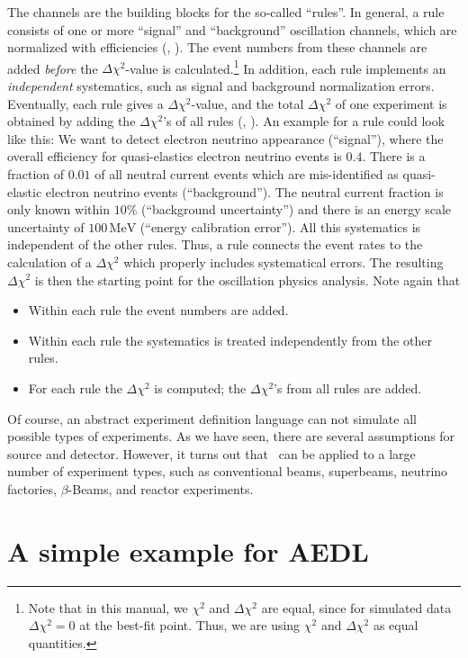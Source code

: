 The channels are the building blocks for the so-called ``rules''. In general, a rule consists of one or more ``signal'' and ``background'' oscillation channels, which are normalized with efficiencies
(\cf, ). The event numbers from these channels are added {\em before} the $\Delta \chi^2$-value is calculated.\footnote{Note that
in this manual, we $\chi^2$ and $\Delta \chi^2$ are equal, since
for simulated data $\Delta \chi^2 = 0$ at the best-fit point. Thus, we
are using $\chi^2$ and $\Delta \chi^2$ as equal quantities.} In addition, each rule implements an {\em independent} systematics, such as signal and background normalization errors. Eventually, each rule gives a $\Delta \chi^2$-value, and the total $\Delta \chi^2$ of one experiment is obtained by adding the $\Delta \chi^2$'s of all rules (\cf, ). 
 An example for a rule could look like this: We want to detect electron
  neutrino appearance (``signal''), where the overall efficiency for 
  quasi-elastics electron neutrino events is $0.4$. There is a fraction of 
  $0.01$ of all neutral current events which are mis-identified as 
  quasi-elastic electron neutrino events (``background''). The neutral 
  current fraction is only known within $10\%$ (``background uncertainty'') 
  and there is
an energy scale uncertainty of $100\,\mathrm{MeV}$ (``energy calibration error'').
All this systematics is independent of the other rules.  Thus, a rule connects the event rates to the calculation of a $\Delta \chi^2$ which properly includes systematical errors. The resulting $\Delta \chi^2$ is then the starting point for the oscillation physics analysis. Note again that
\begin{itemize}
\item
 Within each rule the event numbers are added.
\item
 Within each rule the systematics is treated independently from the other rules.
\item
 For each rule the $\Delta \chi^2$ is computed; the $\Delta \chi^2$'s from all rules are added.
\end{itemize}

Of course, an abstract experiment definition language can not simulate all possible types of experiments. As we have seen, there are several assumptions for source and detector. However, it turns out that \GLOBES\ can be applied to a large number of experiment types, such as conventional beams, superbeams, neutrino factories, $\beta$-Beams, and reactor experiments.

\section{A simple example for AEDL}

